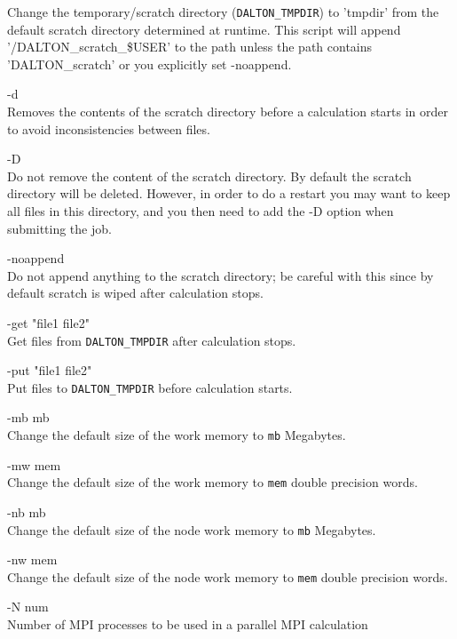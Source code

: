 \begin{list}{--}{}
  Change the temporary/scratch directory (\verb|DALTON_TMPDIR|) to 'tmpdir' from the default scratch directory
  determined at runtime. This script will append '/DALTON\_scratch\_\$USER'
  to the path unless the path contains 'DALTON\_scratch' or you explicitly set
  -noappend.
\item[-d \hfill] \hfill \\
  Removes the contents of the scratch directory before a
  calculation starts in order to avoid inconsistencies between files.
\item[-D \hfill] \hfill \\
  Do not remove the content of the scratch directory. By
  default the scratch directory will be deleted. However, in order to do
  a restart you may want to keep all files in this directory, and you
  then need to add the -D option when submitting the job.
\item[-noappend \hfill] \hfill \\
  Do not append anything to the scratch directory; be careful with
  this since by default scratch is wiped after calculation stops.
\item[-get "file1 file2" \hfill] \hfill \\
  Get files from \verb|DALTON_TMPDIR| after calculation stops.
\item[-put "file1 file2" \hfill] \hfill \\
  Put files to \verb|DALTON_TMPDIR| before calculation starts.
\item[-mb mb \hfill] \hfill \\
  Change the default size of the work memory
   to \verb|mb| Megabytes.
\item[-mw mem \hfill] \hfill \\
  Change the default size of the work memory
   to \verb|mem| double precision words.
\item[-nb mb \hfill] \hfill \\
  Change the default size of the node work memory
   to \verb|mb| Megabytes.
\item[-nw mem \hfill] \hfill \\
  Change the default size of the node work memory
   to \verb|mem| double precision words.
\item[-N num \hfill] \hfill \\
  Number of MPI processes to be used in a parallel MPI calculation

\end{list}
